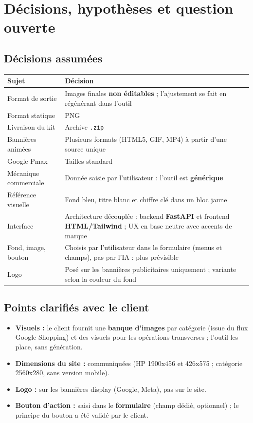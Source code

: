 \documentclass[11pt,a4paper]{article}
\begin{document}
\section{Décisions, hypothèses et question ouverte}
\subsection{Décisions assumées}
\begin{center}\small
\begin{tabular}{@{}>{\raggedright\arraybackslash}p{5.2cm} >{\raggedright\arraybackslash}p{9.5cm}@{}}
\toprule
\textbf{Sujet} & \textbf{Décision} \\
\midrule
Format de sortie & Images finales \textbf{non éditables} ; l'ajustement se fait en régénérant dans l'outil \\
Format statique & PNG \\
Livraison du kit & Archive \texttt{.zip} \\
Bannières animées & Plusieurs formats (HTML5, GIF, MP4) à partir d'une source unique \\
Google Pmax & Tailles standard \\
Mécanique commerciale & Donnée saisie par l'utilisateur : l'outil est \textbf{générique} \\
Référence visuelle & Fond bleu, titre blanc et chiffre clé dans un bloc jaune \\
Interface & Architecture découplée : backend \textbf{FastAPI} et frontend \textbf{HTML/Tailwind} ; UX en base neutre avec accents de marque \\
Fond, image, bouton & Choisis par l'utilisateur dans le formulaire (menus et champs), pas par l'IA : plus prévisible \\
Logo & Posé sur les bannières publicitaires uniquement ; variante selon la couleur du fond \\
\bottomrule
\end{tabular}
\end{center}

\subsection{Points clarifiés avec le client}
\begin{itemize}[leftmargin=1.4em]
  \item \textbf{Visuels :} le client fournit une \textbf{banque d'images} par
        catégorie (issue du flux Google Shopping) et des visuels pour les opérations
        transverses ; l'outil les place, sans génération.
  \item \textbf{Dimensions du site :} communiquées (HP 1900x456 et 426x575 ;
        catégorie 2560x280, sans version mobile).
  \item \textbf{Logo :} sur les bannières display (Google, Meta), pas sur le site.
  \item \textbf{Bouton d'action :} saisi dans le \textbf{formulaire} (champ dédié,
        optionnel) ; le principe du bouton a été validé par le client.
\end{itemize}
\end{document}
